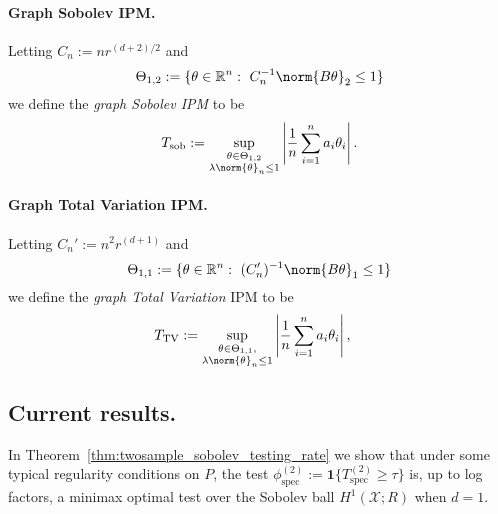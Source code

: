 \documentclass{article}
\newcommand{\Reals}{\mathbb{R}}
\newcommand{\abs}[1]{\left \lvert #1 \right \rvert}
\newcommand{\1}{\mathbf{1}}
\theoremstyle{alden}
\theoremstyle{aldenthm}
\theoremstyle{definition}
\theoremstyle{remark}
\begin{document}
\paragraph{Graph Sobolev IPM.}
Letting $C_n := nr^{(d + 2)/2}$ and
\begin{equation*}
\Theta_{1,2} := \{\theta \in \Reals^n:~ C_n^{-1} \norm{B\theta}_2 \leq 1\} 
\end{equation*}
we define the \emph{graph Sobolev IPM} to be
\begin{equation}
\label{eqn:sobolev_IPM}
T_{\textrm{sob}} := \sup_{\substack{\theta \in \Theta_{1,2} \\ \lambda \norm{\theta}_n \leq 1}} \abs{\frac{1}{n}\sum_{i = 1}^{n} a_i \theta_i}. 
\end{equation}

\paragraph{Graph Total Variation IPM.}
Letting $C_n' := n^{2}r^{(d + 1)}$ and 
\begin{equation*}
\Theta_{1,1} := \{\theta \in \Reals^n:~ (C_n')^{-1} \norm{B\theta}_1 \leq 1\}
\end{equation*}
we define the \emph{graph Total Variation} IPM to be
\begin{equation}
\label{eqn:total_variation_IPM}
T_{\mathrm{TV}} := \sup_{\substack{\theta \in \Theta_{1,1}, \\ \lambda \norm{\theta}_n \leq 1} } \abs{\frac{1}{n}\sum_{i = 1}^{n} a_i \theta_i}, \quad
\end{equation}

\subsection{Current results.}

In Theorem~\ref{thm:twosample_sobolev_testing_rate} we show that under some typical regularity conditions on $P$, the test $\phi_{\textrm{spec}}^{(2)} := \1\{T_{\mathrm{spec}}^{(2)} \geq \tau\}$ is, up to log factors, a minimax optimal test over the Sobolev ball $H^1(\mathcal{X};R)$ when $d = 1$.
\end{document}
